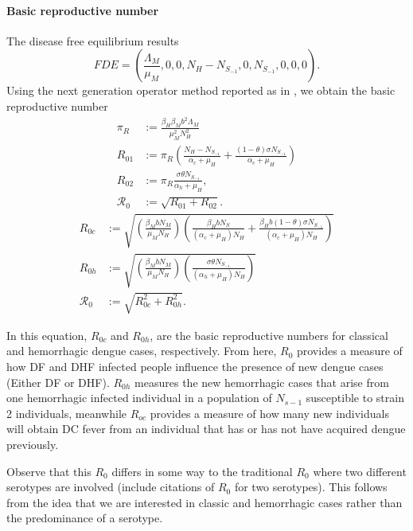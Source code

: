 

%
%
\paragraph{Basic reproductive number}
	The disease free equilibrium results
$$
	FDE=
	\left(
		\frac{\Lambda_M}{\mu_M},
		0,
		0,
		N_H - N_{S_{-1}},
		0,
		N_{S_{-1}},
		0,
		0,
		0
	\right).
$$
Using the next generation operator method 
reported as in \cite{Feng1997a}, we obtain
the basic reproductive number
\begin{equation}
	\begin{aligned}
		\pi_R & :=
			\frac{\beta_H \beta_M b^2 \Lambda_M}{
				\mu_M ^ 2  N_H ^ 2 
		}
	\\
		R_{01} & := 
			\pi_R
			\left(
				\frac{N_H - N_{S_{-1}}}{ \alpha_c + \mu_H}
				+
				\frac{(1- \theta ) \sigma N_{S_{-1}}}{ \alpha_c + \mu_H}
			\right)
		\\
		R_{02}& :=
			\pi_R
				\frac{
					\sigma \theta N_{S_{-1}}
				}{\alpha_h + \mu_H},
	\\
	\mathcal{R}_0 & :=
			\sqrt{ R_{01}+R_{02} }.
	\end{aligned}
\end{equation}
%
\begin{equation}
	\begin{aligned}
		R_{0c} & := \sqrt{
			\left(\frac{\beta_MbN_M}{\mu_MN_H}\right)
			\left(
				\frac{\beta_HbN_S}{ (\alpha_c + \mu_H)N_H}
				+
				\frac{\beta_Hb(1- \theta ) \sigma N_{S_{-1}}}{ (\alpha_c + \mu_H)N_H}
			\right)}
		\\
		R_{0h}& :=\sqrt{
			\left(\frac{\beta_MbN_M}{\mu_MN_H}\right)
				\left(\frac{
					\sigma \theta N_{S_{-1}}
				}{(\alpha_h + \mu_H)N_H}\right)}
	\\
	\mathcal{R}_0 & :=
			\sqrt{ R_{0c}^2+R_{0h}^2 }.
	\end{aligned}
\end{equation}

	In this equation, $R_{0c}$ and $R_{0h}$, are the basic reproductive numbers 
for classical and hemorrhagic dengue cases, respectively. From here, $R_0$ 
provides a measure of how DF and DHF infected people influence the presence of 
new dengue cases (Either DF or DHF). $R_{0h}$ measures the new hemorrhagic 
cases that arise from one hemorrhagic infected individual in a population of 
$N_{s-1}$ susceptible to strain 2 individuals, meanwhile $R_{oc}$ provides a 
measure of how many new individuals will obtain DC fever from an individual 
that has or has not have acquired dengue previously.

	Observe that this $R_0$ differs in some way to the traditional $R_0$ where two
different serotypes are involved (include citations of $R_0$ for two serotypes).
This follows from the idea that we are interested in classic and hemorrhagic
cases rather than the predominance of a serotype.




